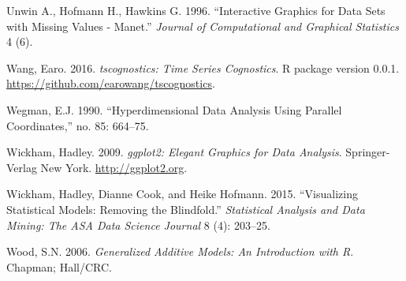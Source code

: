 \documentclass[12pt,]{article}
\theoremstyle{definition}
\theoremstyle{definition}
\theoremstyle{remark}
\begin{document}
\hypertarget{ref-MANET}{}
Unwin A., Hofmann H., Hawkins G. 1996. ``Interactive Graphics for Data
Sets with Missing Values - Manet.'' \emph{Journal of Computational and
Graphical Statistics} 4 (6).

\hypertarget{ref-tscognostics}{}
Wang, Earo. 2016. \emph{tscognostics: Time Series Cognostics}. R package
version 0.0.1. \url{https://github.com/earowang/tscognostics}.

\hypertarget{ref-Wegman:90}{}
Wegman, E.J. 1990. ``Hyperdimensional Data Analysis Using Parallel
Coordinates,'' no. 85: 664--75.

\hypertarget{ref-ggplot2}{}
Wickham, Hadley. 2009. \emph{ggplot2: Elegant Graphics for Data
Analysis}. Springer-Verlag New York. \url{http://ggplot2.org}.

\hypertarget{ref-model-vis-paper}{}
Wickham, Hadley, Dianne Cook, and Heike Hofmann. 2015. ``Visualizing
Statistical Models: Removing the Blindfold.'' \emph{Statistical Analysis
and Data Mining: The ASA Data Science Journal} 8 (4): 203--25.

\hypertarget{ref-mgcv}{}
Wood, S.N. 2006. \emph{Generalized Additive Models: An Introduction with
R}. Chapman; Hall/CRC.
\end{document}
